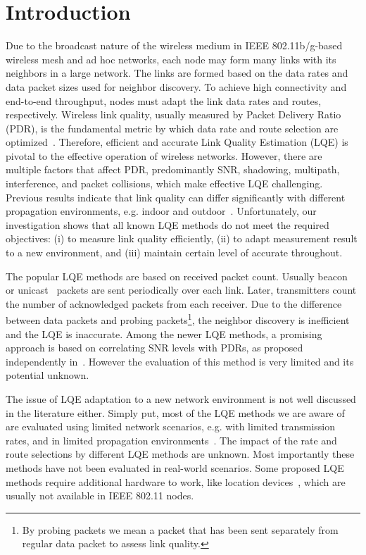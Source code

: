 \documentclass[11pt,draftclsnofoot,journal,onecolumn]{IEEEtran}
\begin{document}
\IEEEpeerreviewmaketitle

\section{Introduction}
\label{sec:introduction}

Due to the broadcast nature of the wireless medium in IEEE 802.11b/g-based wireless mesh and ad hoc networks, each node may form many links with its neighbors in a large network. The links are formed based on the data rates and data packet sizes used for neighbor discovery. To achieve high connectivity and end-to-end throughput, nodes must adapt the link data rates and routes, respectively. Wireless link quality, usually measured by Packet Delivery Ratio (PDR), is the fundamental metric by which data rate and route selection are optimized~\cite{Bicket_SampleRate_2005,BicketMobicom2005}. Therefore, efficient and accurate Link Quality Estimation (LQE) is pivotal to the effective operation of wireless networks. However, there are multiple factors that affect PDR, predominantly SNR, shadowing, multipath, interference, and packet collisions, which make effective LQE challenging. Previous results indicate that link quality can differ significantly with different propagation environments, e.g. indoor and outdoor~\cite{zuniga_2004_secon}. Unfortunately, our investigation shows that all known LQE methods do not meet the required objectives: (i) to  measure link quality efficiently, (ii) to adapt measurement result to a new environment, and (iii) maintain certain level of accurate throughout.

The popular LQE methods are based on received packet count. Usually beacon~\cite{BicketMobicom2005} or unicast~\cite{Kim2006,Kim_Ton_2009} packets are sent periodically over each link. Later, transmitters count the number of acknowledged packets from each receiver. Due to the difference between data packets and probing packets\footnote{By probing packets we mean a packet that has been sent separately from regular data packet to assess link quality.}, the neighbor discovery is inefficient and the LQE is inaccurate. Among the newer LQE methods, a promising approach is based on correlating SNR levels with PDRs, as proposed independently in~\cite{Zhou_VTC_2009,verma_2008_Wimesh,Zhou_Pernets_2007}. However the evaluation of this method is very limited and its potential unknown.

The issue of LQE adaptation to a new network environment is not well discussed in the literature either. Simply put, most of the LQE methods we are aware of are evaluated using limited network scenarios, e.g. with limited transmission rates, and in limited propagation environments~\cite{souryal_2006_wcnc,wang_2006_realman}. The impact of the rate and route selections by different LQE methods are unknown. Most importantly these methods have not been evaluated in real-world scenarios. Some proposed LQE methods require additional hardware to work, like location devices~\cite{zhang_2009_tmc}, which are usually not available in IEEE 802.11 nodes.
\end{document}
